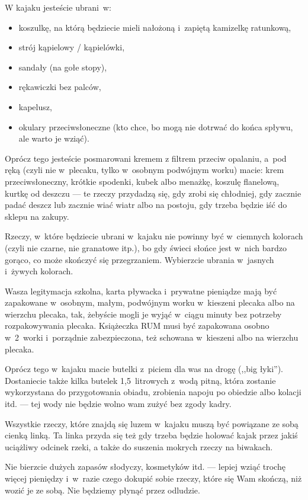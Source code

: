 W kajaku jesteście ubrani~w:
\begin{itemize}
\item koszulkę, na którą będziecie mieli nałożoną i~zapiętą kamizelkę ratunkową,
\item strój kąpielowy / kąpielówki,
\item sandały (na gołe stopy),
\item rękawiczki bez palców,
\item kapelusz,
\item okulary przeciwsłoneczne (kto chce, bo mogą nie dotrwać do końca spływu, ale warto je wziąć).
\end{itemize}
Oprócz tego jesteście posmarowani kremem z filtrem przeciw opalaniu, a~pod ręką (czyli nie w~plecaku, tylko w~osobnym podwójnym worku) macie: krem przeciwsłoneczny, krótkie spodenki, kubek albo menażkę, koszulę flanelową, kurtkę od deszczu --- te rzeczy przydadzą się, gdy zrobi się chłodniej, gdy zacznie padać deszcz lub zacznie wiać wiatr albo na postoju, gdy trzeba będzie iść do sklepu na zakupy.

Rzeczy, w~które będziecie ubrani w~kajaku nie powinny być w~ciemnych kolorach (czyli nie czarne, nie granatowe itp.), bo gdy świeci słońce jest w~nich bardzo gorąco, co może skończyć się przegrzaniem. Wybierzcie ubrania w~jasnych i~żywych kolorach.

Wasza legitymacja szkolna, karta pływacka i~prywatne pieniądze mają być zapakowane w~osobnym, małym, podwójnym worku w~kieszeni plecaka albo na wierzchu plecaka, tak, żebyście mogli je wyjąć w~ciągu minuty bez potrzeby rozpakowywania plecaka. Książeczka RUM musi być zapakowana osobno w~2~worki i~porządnie zabezpieczona, też schowana w~kieszeni albo na wierzchu plecaka.

Oprócz tego w~kajaku macie butelki z~piciem dla was na drogę (,,big łyki''). Dostaniecie także kilka butelek 1,5~litrowych z~wodą pitną, która zostanie wykorzystana do przygotowania obiadu, zrobienia napoju po obiedzie albo kolacji itd. --- tej wody nie będzie wolno wam zużyć bez zgody kadry.

Wszystkie rzeczy, które znajdą się luzem w~kajaku muszą być powiązane ze sobą cienką linką. Ta linka przyda się też gdy trzeba będzie holować kajak przez jakiś uciążliwy odcinek rzeki, a także do suszenia mokrych rzeczy na biwakach.

Nie bierzcie dużych zapasów słodyczy, kosmetyków itd. --- lepiej wziąć trochę więcej pieniędzy i~w~razie czego dokupić sobie rzeczy, które się Wam skończą, niż wozić je ze sobą. Nie będziemy płynąć przez odludzie.
 

